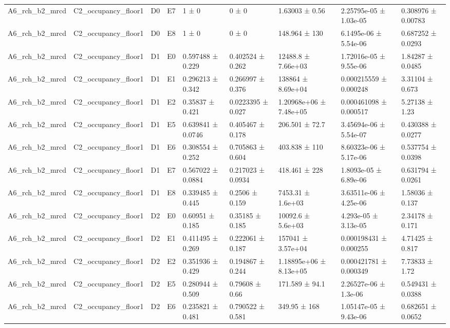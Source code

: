 \begin{table}
\begin{tabular}{lllllllll}
A6\_rch\_b2\_mrcd & C2\_occupancy\_floor1 & D0 & E7 & 1 ± 0 & 0 ± 0 & 1.63003 ± 0.56 & 2.25795e-05 ± 1.03e-05 & 0.308976 ± 0.00783 \\
A6\_rch\_b2\_mrcd & C2\_occupancy\_floor1 & D0 & E8 & 1 ± 0 & 0 ± 0 & 148.964 ± 130 & 6.1495e-06 ± 5.54e-06 & 0.687252 ± 0.0293 \\
A6\_rch\_b2\_mrcd & C2\_occupancy\_floor1 & D1 & E0 & 0.597488 ± 0.229 & 0.402524 ± 0.262 & 12488.8 ± 7.66e+03 & 1.72016e-05 ± 9.55e-06 & 1.84287 ± 0.0485 \\
A6\_rch\_b2\_mrcd & C2\_occupancy\_floor1 & D1 & E1 & 0.296213 ± 0.342 & 0.266997 ± 0.376 & 138864 ± 8.69e+04 & 0.000215559 ± 0.000248 & 3.31104 ± 0.673 \\
A6\_rch\_b2\_mrcd & C2\_occupancy\_floor1 & D1 & E2 & 0.35837 ± 0.421 & 0.0223395 ± 0.027 & 1.20968e+06 ± 7.48e+05 & 0.000461098 ± 0.000517 & 5.27138 ± 1.23 \\
A6\_rch\_b2\_mrcd & C2\_occupancy\_floor1 & D1 & E5 & 0.639841 ± 0.0746 & 0.405467 ± 0.178 & 206.501 ± 72.7 & 3.45694e-06 ± 5.54e-07 & 0.430388 ± 0.0277 \\
A6\_rch\_b2\_mrcd & C2\_occupancy\_floor1 & D1 & E6 & 0.308554 ± 0.252 & 0.705863 ± 0.604 & 403.838 ± 110 & 8.60323e-06 ± 5.17e-06 & 0.537754 ± 0.0398 \\
A6\_rch\_b2\_mrcd & C2\_occupancy\_floor1 & D1 & E7 & 0.567022 ± 0.0884 & 0.217023 ± 0.0934 & 418.461 ± 228 & 1.8093e-05 ± 6.89e-06 & 0.631794 ± 0.0261 \\
A6\_rch\_b2\_mrcd & C2\_occupancy\_floor1 & D1 & E8 & 0.339485 ± 0.445 & 0.2506 ± 0.159 & 7453.31 ± 1.6e+03 & 3.63511e-06 ± 4.25e-06 & 1.58036 ± 0.137 \\
A6\_rch\_b2\_mrcd & C2\_occupancy\_floor1 & D2 & E0 & 0.60951 ± 0.185 & 0.35185 ± 0.185 & 10092.6 ± 5.6e+03 & 4.293e-05 ± 3.13e-05 & 2.34178 ± 0.171 \\
A6\_rch\_b2\_mrcd & C2\_occupancy\_floor1 & D2 & E1 & 0.411495 ± 0.269 & 0.222061 ± 0.187 & 157041 ± 3.57e+04 & 0.000198431 ± 0.000255 & 4.71425 ± 0.817 \\
A6\_rch\_b2\_mrcd & C2\_occupancy\_floor1 & D2 & E2 & 0.351936 ± 0.429 & 0.194867 ± 0.244 & 1.18895e+06 ± 8.13e+05 & 0.000421781 ± 0.000349 & 7.73833 ± 1.72 \\
A6\_rch\_b2\_mrcd & C2\_occupancy\_floor1 & D2 & E5 & 0.280944 ± 0.509 & 0.79608 ± 0.66 & 171.589 ± 94.1 & 2.26527e-06 ± 1.3e-06 & 0.549431 ± 0.0388 \\
A6\_rch\_b2\_mrcd & C2\_occupancy\_floor1 & D2 & E6 & 0.235821 ± 0.481 & 0.790522 ± 0.581 & 349.95 ± 168 & 1.05147e-05 ± 9.43e-06 & 0.682651 ± 0.0652 \\

\end{tabular}
\end{table}
